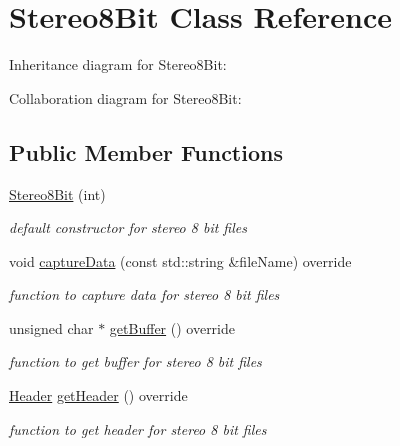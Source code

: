\hypertarget{classStereo8Bit}{}\section{Stereo8\+Bit Class Reference}
\label{classStereo8Bit}


Inheritance diagram for Stereo8\+Bit\+:


Collaboration diagram for Stereo8\+Bit\+:
\subsection*{Public Member Functions}
\begin{DoxyCompactItemize}
\item 
\mbox{\label{classStereo8Bit_ac103e133ff14aa98556003c51833b771}} 
\hyperlink{classStereo8Bit_ac103e133ff14aa98556003c51833b771}{Stereo8\+Bit} (int)
\begin{DoxyCompactList}\small\item\em default constructor for stereo 8 bit files \end{DoxyCompactList}\item 
void \hyperlink{classStereo8Bit_aabe25fe6e9bef1ddb8e1b2d4f38e5232}{capture\+Data} (const std\+::string \&file\+Name) override
\begin{DoxyCompactList}\small\item\em function to capture data for stereo 8 bit files \end{DoxyCompactList}\item 
\mbox{\label{classStereo8Bit_a569b7bb24a706a0cc8f2dc41ffbb8f8d}} 
unsigned char $\ast$ \hyperlink{classStereo8Bit_a569b7bb24a706a0cc8f2dc41ffbb8f8d}{get\+Buffer} () override
\begin{DoxyCompactList}\small\item\em function to get buffer for stereo 8 bit files \end{DoxyCompactList}\item 
\mbox{\label{classStereo8Bit_a0c1590becb245334ae7c359d31e033a1}} 
\hyperlink{structHeader}{Header} \hyperlink{classStereo8Bit_a0c1590becb245334ae7c359d31e033a1}{get\+Header} () override
\begin{DoxyCompactList}\small\item\em function to get header for stereo 8 bit files \end{DoxyCompactList}\item 

\end{DoxyCompactItemize}
